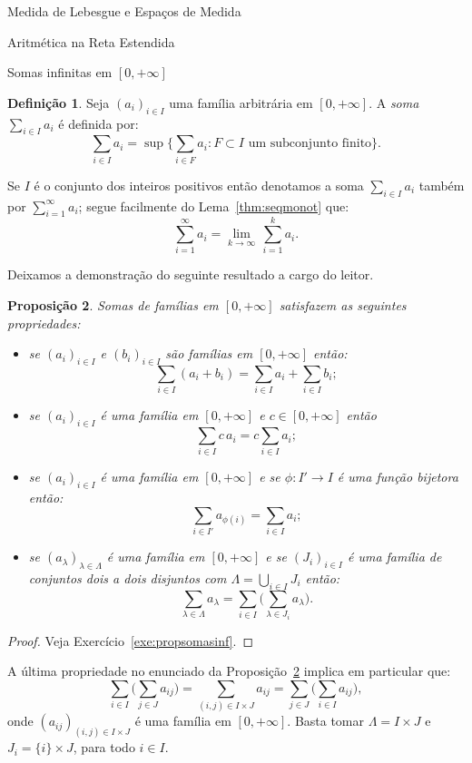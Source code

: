 \documentclass[oneside,final,11pt]{amsbook}
\theoremstyle{remark}\newtheorem{exercise}{Exercício}[chapter]
\theoremstyle{remark}\newtheorem{*exercise}[exercise]{\hbox to 0pt{\hskip 0pt minus 1fil*}Exercício}
\theoremstyle{definition}\newtheorem{exdefin}{Definição}[chapter]
\theoremstyle{plain}\newtheorem{teo}{Teorema}[section]
\theoremstyle{plain}\newtheorem{lem}[teo]{Lema}
\theoremstyle{plain}\newtheorem{prop}[teo]{Proposição}
\theoremstyle{plain}\newtheorem{cor}[teo]{Corolário}
\theoremstyle{definition}\newtheorem{defin}[teo]{Definição}
\theoremstyle{remark}\newtheorem{rem}[teo]{Observação}
\theoremstyle{definition}\newtheorem{notation}[teo]{Notação}
\theoremstyle{definition}\newtheorem{convention}[teo]{Convenção}
\theoremstyle{definition}\newtheorem{example}[teo]{Exemplo}
\numberwithin{section}{chapter}
\numberwithin{equation}{section}
\begin{document}
\begin{chapter}{Medida de Lebesgue e Espaços de Medida}
\begin{section}{Aritmética na Reta Estendida}
\begin{subsection}{Somas infinitas em ${[0,+\infty]}$}
\begin{defin}
Seja $(a_i)_{i\in I}$ uma família arbitrária em $[0,+\infty]$. A {\em soma\/}
$\sum_{i\in I}a_i$ é definida por:
\[\sum_{i\in I}a_i=\sup\Big\{\sum_{i\in F}a_i:\text{$F\subset I$ um subconjunto finito}\Big\}.\]
\end{defin}
Se $I$ é o conjunto dos inteiros positivos então denotamos a soma $\sum_{i\in I}a_i$ também
por $\sum_{i=1}^\infty a_i$; segue facilmente do Lema~\ref{thm:seqmonot} que:
\[\sum_{i=1}^\infty a_i=\lim_{k\to\infty}\,\sum_{i=1}^ka_i.\]

Deixamos a demonstração do seguinte resultado a cargo do leitor.
\begin{prop}\label{thm:propsomasinf}
Somas de famílias em $[0,+\infty]$ satisfazem as seguintes propriedades:
\begin{itemize}
\item se $(a_i)_{i\in I}$ e $(b_i)_{i\in I}$ são famílias em $[0,+\infty]$
então:
\[\sum_{i\in I}(a_i+b_i)=\sum_{i\in I}a_i+\sum_{i\in I}b_i;\]
\item se $(a_i)_{i\in I}$ é uma família em $[0,+\infty]$ e $c\in[0,+\infty]$ então
\[\sum_{i\in I}c\,a_i=c\sum_{i\in I}a_i;\]
\item se $(a_i)_{i\in I}$ é uma família em $[0,+\infty]$ e se $\phi:I'\to I$
é uma função bijetora então:
\[\sum_{i\in I'}a_{\phi(i)}=\sum_{i\in I}a_i;\]
\item se $(a_\lambda)_{\lambda\in\Lambda}$ é uma família em $[0,+\infty]$
e se $(J_i)_{i\in I}$ é uma família de conjuntos dois a dois disjuntos
com $\Lambda=\bigcup_{i\in I}J_i$ então:
\[\sum_{\lambda\in\Lambda}a_\lambda=\sum_{i\in I}\Big(\sum_{\lambda\in J_i}a_\lambda\Big).\]
\end{itemize}
\end{prop}
\begin{proof}
Veja Exercício~\ref{exe:propsomasinf}.
\end{proof}

A última propriedade no enunciado da Proposição~\ref{thm:propsomasinf} implica em particular que:
\[\sum_{i\in I}\Big(\sum_{j\in J}a_{ij}\Big)=\!\!\!\sum_{(i,j)\in I\times J}\!\!\!a_{ij}=
\sum_{j\in J}\Big(\sum_{i\in I}a_{ij}\Big),\]
onde $(a_{ij})_{(i,j)\in I\times J}$ é uma família em $[0,+\infty]$. Basta tomar
$\Lambda=I\times J$ e $J_i=\{i\}\times J$, para todo $i\in I$.

\end{subsection}

\end{section}


\end{chapter}
\end{document}
